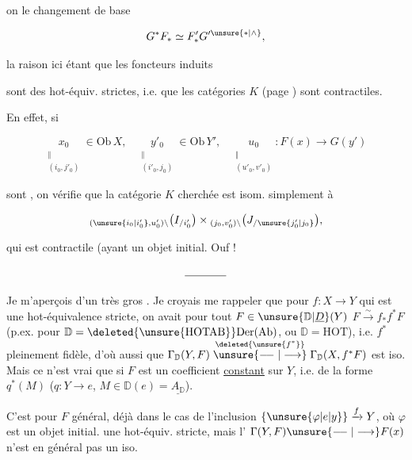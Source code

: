 
on  le changement de base

\[ G^*F_*\simeq F'_*G'^{\unsure{*|\wedge}}, \]

la raison ici étant que les foncteurs induits


sont des hot-équiv.  strictes, i.e. que les catégories $K$ (page ) sont contractiles.

En effet, si

\[
\underset{\substack{\Vert\\(i_0,j'_0)}}{x_0}\in\mathrm{Ob}\,X,\quad
\underset{\substack{\Vert\\(i'_0,j_0)}}{y'_0}\in\mathrm{Ob}\,Y',\quad
\underset{\substack{\Vert\\(u'_0,v'_0)}}{u_0}:F(x)\longrightarrow G(y')
\]


sont , on vérifie que la catégorie $K$ cherchée est  isom. simplement à

\[
{}_{(\unsure{i_0|i'_0},u'_0)\backslash}\bigl(I_{/i'_0}\bigr)\times{}_{(j_0,v'_0)\backslash}\bigl(J_{/\unsure{j'_0|j_0}}\bigr),
\]

qui est contractile (ayant un objet  initial. \qquad Ouf !

\[ \rule{1.3cm}{0.4pt} \]

Je m'aperçois d'un très gros . Je croyais me rappeler que pour $f:X\longrightarrow Y$ qui est une hot-équivalence stricte, on avait pour tout $F\in\unsure{\mathbb D|\underline D}(Y)$ $F\xrightarrow{\sim}f_*f^*F$ (p.ex. pour $\mathbb D=\deleted{\unsure{\mathrm{HOTAB}}}\mathrm{Der}(\mathrm{Ab})$, ou $\mathbb D=\mathrm{HOT}$), i.e. $f^*$ pleinement fidèle,  d'où aussi que $\Gamma_{\mathbb D}(Y,F)\mathrel{\overset{\deleted{\unsure{f^*}}}{\unsure{\relbar\joinrel\relbar|\longrightarrow}}}\Gamma_{\mathbb D}(X,f^*F)$ est iso. Mais  ce  n'est vrai que si $F$ est un coefficient \uline{constant} sur $Y$, i.e. de la forme $q^*(M)$ ($q:Y\longrightarrow e$, $M\in\mathbb D(e)=\underline{A_{\mathbb D}}$).

C'est  pour $F$ général, déjà dans le cas de l'inclusion $\{\unsure{\varphi|e|y}\}\xrightarrow{f}Y$, où $\varphi$ est un objet initial.   une hot-équiv. stricte, mais  l' $\Gamma(Y,F)\unsure{\relbar\joinrel\relbar|\longrightarrow}F(x)$ n'est  en général pas un iso.
